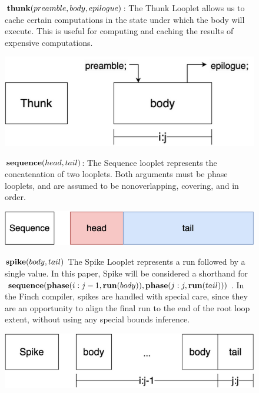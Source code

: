 \begin{figure}[ht]
    \begin{minipage}[c]{0.65\linewidth}
        $\text{\textbf{thunk}}(preamble, body, epilogue)$: The Thunk Looplet
        allows us to cache certain computations in the state under which the
        body will execute. This is useful for computing and caching the results
        of expensive computations.
    \end{minipage}%
    \begin{minipage}[c]{0.35\linewidth}
        \centering
        \includegraphics[scale=0.20]{Looplets-thunk.png}
    \end{minipage}
    \vspace{3pt}

    \begin{minipage}[c]{0.65\linewidth}
        $\text{\textbf{sequence}}(head, tail)$: The Sequence looplet represents the
        concatenation of two looplets. Both arguments must be phase looplets, and
        are assumed to be nonoverlapping, covering, and in order.
    \end{minipage}%
    \begin{minipage}[c]{0.35\linewidth}
        \centering
        \includegraphics[scale=0.20]{Looplets-sequence.png}
    \end{minipage}
    \vspace{3pt}

    \begin{minipage}[c]{0.65\linewidth}
        $\text{\textbf{spike}}(body, tail)$ The Spike Looplet represents a run
        followed by a single value. In this paper, Spike will be considered a
        shorthand for $\text{\textbf{sequence}}(\text{\textbf{phase}}(i:j-1, \text{\textbf{run}}(body)),
        \text{\textbf{phase}}(j:j, \text{\textbf{run}}(tail)))$.  In the Finch compiler, spikes are
        handled with special care, since they are an opportunity to align the
        final run to the end of the root loop extent, without using any special
        bounds inference.
    \end{minipage}%
    \begin{minipage}[c]{0.35\linewidth}
        \centering
        \includegraphics[scale=0.20]{Looplets-spike.png}
    \end{minipage}
    \vspace{3pt}


\end{figure}
